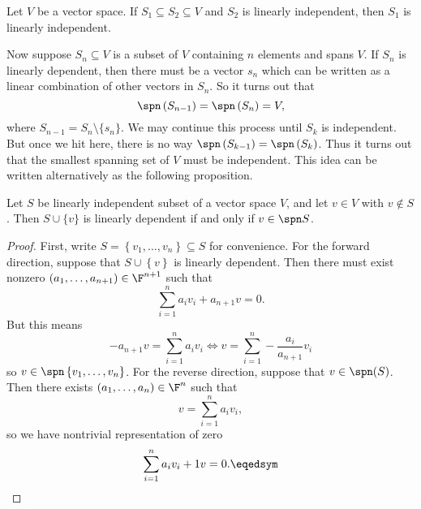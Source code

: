 \documentclass[linearalgebraI]{subfiles}
\begin{document}
    \begin{cor}{}
        Let $V$ be a vector space. If $S_1\subseteq S_2\subseteq V$ and $S_2$ is linearly independent, then $S_1$ is linearly independent.
    \end{cor}	

    \begin{remark}
        Now suppose $S_n\subseteq V$ is a subset of $V$ containing $n$ elements and spans $V$. If $S_n$ is linearly dependent, then there must be a vector $s_n$ which can be written as a linear combination of other vectors in $S_n$. So it turns out that
        \begin{equation*}
            \spn \left( S_{n-1} \right)  = \spn\left( S_n \right)  = V,
        \end{equation*}
        where $S_{n-1} = S_n\setminus \lbrace s_n \rbrace$. We may continue this process until $S_k$ is independent. But once we hit here, there is no way $\spn \left( S_{k-1} \right)  = \spn\left( S_k \right) $. Thus it turns out that the smallest spanning set of $V$ must be independent. This idea can be written alternatively as the following proposition.
    \end{remark}

    \begin{prop}{}
        Let $S$ be linearly independent subset of a vector space $V$, and let $v\in V$ with $v\notin S$. Then $S\cup \lbrace v \rbrace$ is linearly dependent if and only if $v\in \spn S$.
    \end{prop}

    \begin{proof}
        First, write $S = \left\lbrace v_1, \ldots, v_n \right\rbrace \subseteq S$ for convenience. For the forward direction, suppose that $S\cup \left\lbrace v \right\rbrace$ is linearly dependent. Then there must exist nonzero $(a_1, \ldots, a_{n+1})\in \F^{n+1}$ such that
        \begin{equation*}
            \sum^{n}_{i=1} a_iv_i + a_{n+1}v = 0.
        \end{equation*}
        But this means
        \begin{equation*}
            -a_{n+1}v = \sum^n_{i=1} a_iv_i \iff v = \sum^n_{i=1} -\frac{a_i}{a_{n+1}}v_i
        \end{equation*}
        so $v\in \spn \left\lbrace v_1, \ldots, v_n \right\rbrace$. For the reverse direction, suppose that $v\in \spn(S)$. Then there exists $(a_1, \ldots, a_n)\in \F^n$ such that
        \begin{equation*}
            v = \sum^n_{i=1} a_iv_i,
        \end{equation*}
        so we have nontrivial representation of zero
        \begin{equation*}
            \sum^n_{i=1} a_iv_i + 1v = 0. \eqedsym
        \end{equation*}
    \end{proof}
\end{document}
